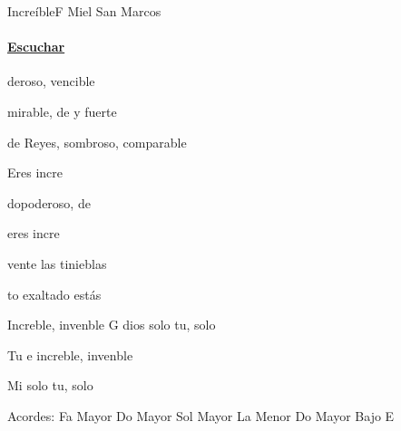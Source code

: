 \documentclass[12pt, spanish]{book}
\begin{document}
    \begin{song}{Increíble}{F}
        {} %
        {Miel San Marcos}
        {} %
        {}
        \ifChordBk
        \paragraph{\mbox{}\hfill\protect\href{https://open.spotify.com/intl-es/track/2vfw87kzcfClc8RwGYZgro}{Escuchar}\mbox{}\hfill}
        \fi



        \begin{SBOpGroup}
            deroso, vencible

            mirable, de y fuerte

             de Reyes, sombroso, comparable 
        \end{SBOpGroup}

        \begin{SBChorus}
            Eres incre

            dopoderoso, de

            eres incre

            vente las tinieblas

            to exaltado estás
        \end{SBChorus}

        \begin{SBOpGroup}
            Increble, invenble
            G
            dios solo tu, solo 

            Tu e increble, invenble

            Mi  solo tu, solo 
        \end{SBOpGroup}



        \ifChordBk
        \begin{SBOpGroup}
            Acordes:\break
            \upchord{\F}\qquad Fa Mayor \hfill
            \upchord{\C}\qquad Do Mayor \hfill\null\break
            \upchord{\G}\qquad Sol Mayor \hfill\null
            \upchord{\Am}\qquad La Menor \hfill\null\break
            \upchord{\CE}\qquad Do Mayor Bajo E  \hfill\break
        \end{SBOpGroup}
        \fi
    \end{song}
\end{document}
